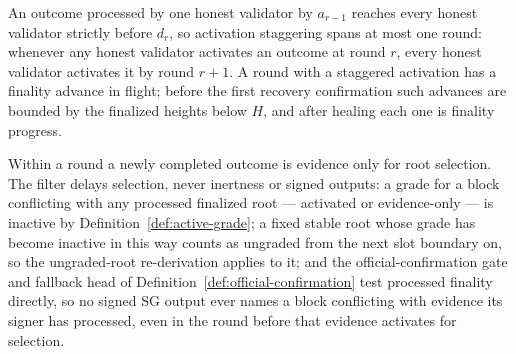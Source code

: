 \begin{remark}
\label{rem:activation-stagger}
An outcome processed by one honest validator by
\(a_{r-1}\) reaches every honest validator strictly before \(d_r\), so
activation staggering spans at most one round: whenever any honest
validator activates an outcome at round \(r\), every honest validator
activates it by round \(r+1\).  A round with a staggered activation has
a finality advance in flight; before the first recovery confirmation such
advances are bounded by the finalized heights below \(H\), and after
healing each one is finality progress.

Within a round a
newly completed outcome is evidence only for root selection.  The filter
delays selection, never inertness or signed outputs: a grade for a block
conflicting with
any processed finalized root --- activated or evidence-only --- is
inactive by Definition~\ref{def:active-grade}; a fixed stable root
whose grade has become inactive in this way counts as ungraded from the
next slot boundary on, so the ungraded-root re-derivation applies to it;
and the official-confirmation gate and fallback head of
Definition~\ref{def:official-confirmation} test processed finality
directly, so no signed SG output ever names a block conflicting with
evidence its signer has processed, even in the round before that
evidence activates for selection.
\end{remark}

